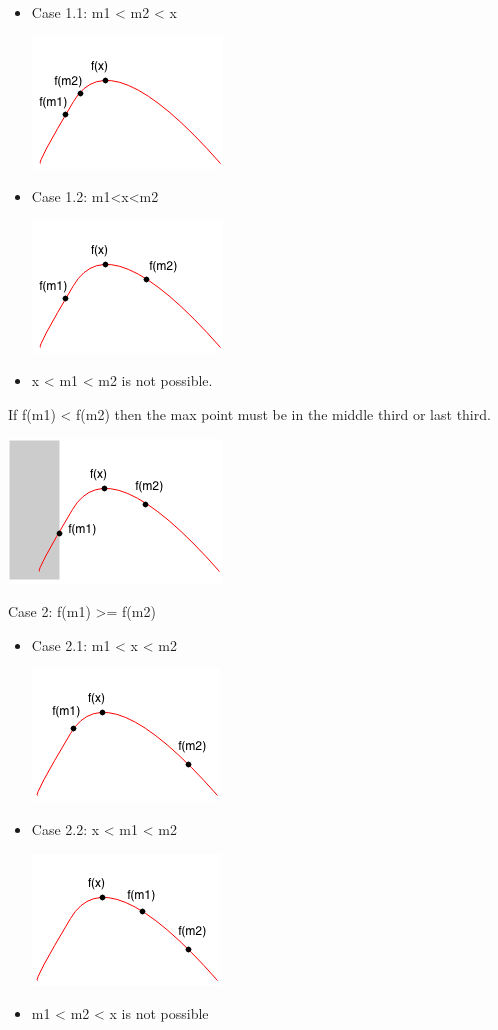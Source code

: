 \documentclass[11pt,oneside]{book}
\makeatletter
\def\maxwidth#1{\ifdim\Gin@nat@width>#1 #1\else\Gin@nat@width\fi}
\makeatother
\begin{document}
\begin{itemize}
\item Case 1.1:  m1 < m2 < x

\includegraphics[width=\maxwidth{\textwidth}]{ternarycase11.png}
\item Case 1.2: m1<x<m2

\includegraphics[width=\maxwidth{\textwidth}]{ternarycase12.png}
\item x < m1 < m2 is not possible.
\end{itemize}

If f(m1) < f(m2) then the max point must be in the middle third or last third.

\includegraphics[width=\maxwidth{\textwidth}]{ternarycase1.png}

Case 2: f(m1) >= f(m2)

\begin{itemize}
\item Case 2.1: m1 < x < m2

\includegraphics[width=\maxwidth{\textwidth}]{ternarycase21.png}
\item Case 2.2: x < m1 < m2

\includegraphics[width=\maxwidth{\textwidth}]{ternarycase22.png}
\item m1 < m2 < x is not possible
\end{itemize}
\end{document}
